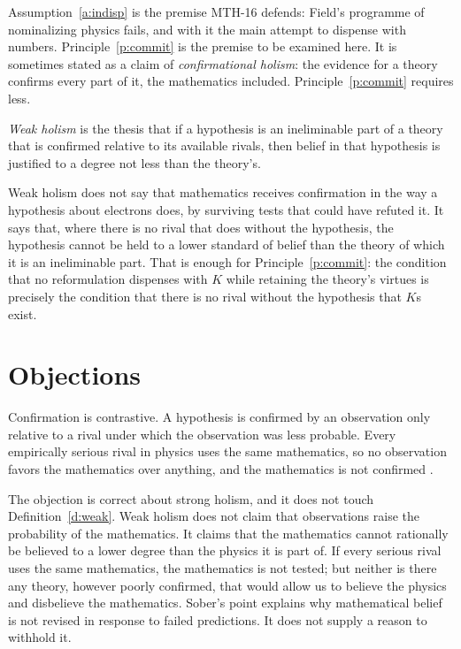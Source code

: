 \documentclass{situationist-preprint}
\begin{document}
Assumption~\ref{a:indisp} is the premise MTH-16 defends: Field's programme of nominalizing physics fails, and with it the main attempt to dispense with numbers. Principle~\ref{p:commit} is the premise to be examined here. It is sometimes stated as a claim of \emph{confirmational holism}: the evidence for a theory confirms every part of it, the mathematics included. Principle~\ref{p:commit} requires less.

\begin{definition}\label{d:weak}
\emph{Weak holism} is the thesis that if a hypothesis is an ineliminable part of a theory that is confirmed relative to its available rivals, then belief in that hypothesis is justified to a degree not less than the theory's.
\end{definition}

Weak holism does not say that mathematics receives confirmation in the way a hypothesis about electrons does, by surviving tests that could have refuted it. It says that, where there is no rival that does without the hypothesis, the hypothesis cannot be held to a lower standard of belief than the theory of which it is an ineliminable part. That is enough for Principle~\ref{p:commit}: the condition that no reformulation dispenses with $K$ while retaining the theory's virtues is precisely the condition that there is no rival without the hypothesis that $K$s exist.

\section{Objections}\label{s:obj}

\begin{objection}
Confirmation is contrastive. A hypothesis is confirmed by an observation only relative to a rival under which the observation was less probable. Every empirically serious rival in physics uses the same mathematics, so no observation favors the mathematics over anything, and the mathematics is not confirmed \citep{Sober1993}.
\end{objection}

\begin{reply}
The objection is correct about strong holism, and it does not touch Definition~\ref{d:weak}. Weak holism does not claim that observations raise the probability of the mathematics. It claims that the mathematics cannot rationally be believed to a lower degree than the physics it is part of. If every serious rival uses the same mathematics, the mathematics is not tested; but neither is there any theory, however poorly confirmed, that would allow us to believe the physics and disbelieve the mathematics. Sober's point explains why mathematical belief is not revised in response to failed predictions. It does not supply a reason to withhold it.
\end{reply}
\end{document}
